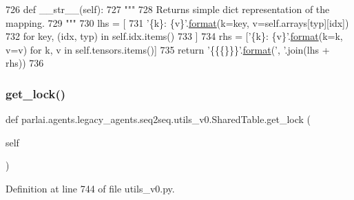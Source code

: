 \begin{DoxyCode}
726     \textcolor{keyword}{def }\_\_str\_\_(self):
727         \textcolor{stringliteral}{"""}
728 \textcolor{stringliteral}{        Returns simple dict representation of the mapping.}
729 \textcolor{stringliteral}{        """}
730         lhs = [
731             \textcolor{stringliteral}{'\{k\}: \{v\}'}.\hyperlink{namespaceparlai_1_1chat__service_1_1services_1_1messenger_1_1shared__utils_a32e2e2022b824fbaf80c747160b52a76}{format}(k=key, v=self.arrays[typ][idx])
732             \textcolor{keywordflow}{for} key, (idx, typ) \textcolor{keywordflow}{in} self.idx.items()
733         ]
734         rhs = [\textcolor{stringliteral}{'\{k\}: \{v\}'}.\hyperlink{namespaceparlai_1_1chat__service_1_1services_1_1messenger_1_1shared__utils_a32e2e2022b824fbaf80c747160b52a76}{format}(k=k, v=v) \textcolor{keywordflow}{for} k, v \textcolor{keywordflow}{in} self.tensors.items()]
735         \textcolor{keywordflow}{return} \textcolor{stringliteral}{'\{\{\{\}\}\}'}.\hyperlink{namespaceparlai_1_1chat__service_1_1services_1_1messenger_1_1shared__utils_a32e2e2022b824fbaf80c747160b52a76}{format}(\textcolor{stringliteral}{', '}.join(lhs + rhs))
736 
\end{DoxyCode}
\mbox{\label{classparlai_1_1agents_1_1legacy__agents_1_1seq2seq_1_1utils__v0_1_1SharedTable_ad5d29371323182d5d5431300ee6aaba1}} 
\subsubsection{\texorpdfstring{get\+\_\+lock()}{get\_lock()}}
{\footnotesize\ttfamily def parlai.\+agents.\+legacy\+\_\+agents.\+seq2seq.\+utils\+\_\+v0.\+Shared\+Table.\+get\+\_\+lock (\begin{DoxyParamCaption}\item[{}]{self }\end{DoxyParamCaption})}



Definition at line 744 of file utils\+\_\+v0.\+py.


